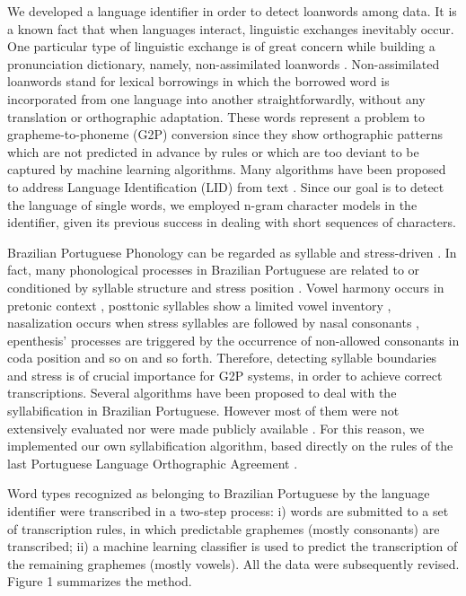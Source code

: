 We developed a language identifier in order to detect loanwords among data. It is a known fact that when languages interact, linguistic exchanges inevitably occur. One particular type of linguistic exchange is of great concern while building a pronunciation dictionary, namely, non-assimilated loanwords \cite{Bussmann96}. Non-assimilated loanwords stand for lexical borrowings in which the borrowed word is incorporated from one language into another straightforwardly, without any translation or orthographic adaptation. These words represent a problem to grapheme-to-phoneme (G2P) conversion since they show orthographic patterns which are not predicted in advance by rules or which are too deviant to be captured by machine learning algorithms. Many algorithms have been proposed to address Language Identification (LID) from text \cite{Bergsma2012, Bilcu2006, Dolf2012, Zampieri2012}. Since our goal is to detect the language of single words, we employed n-gram character  models in the identifier, given its previous success in dealing with short sequences of characters. 

Brazilian Portuguese Phonology can be regarded as syllable and stress-driven \cite{Cristofaro2005}. In fact, many phonological processes in Brazilian Portuguese are related to or conditioned by syllable structure and stress position \cite{Girelli1990}. Vowel harmony occurs in pretonic context \cite{Bisol1989}, posttonic syllables show a limited vowel inventory \cite{Cristofaro2005}, nasalization occurs when stress syllables are followed by nasal consonants \cite{Quicoli1990}, epenthesis' processes are triggered by the occurrence of non-allowed consonants in coda position \cite{Delatorre2005} and so on and so forth. Therefore, detecting syllable boundaries and stress is of crucial importance for G2P systems, in order to achieve correct transcriptions. Several algorithms have been proposed to deal with the syllabification in Brazilian Portuguese. However most of them were not extensively evaluated nor were made publicly available \cite{Oliveira2005, Nhenhem2012, Neto2011, Rocha2013}. For this reason, we implemented our own syllabification algorithm, 
based directly on the rules of the last Portuguese Language Orthographic Agreement \cite{Acordo2009}. 

Word types recognized as belonging to Brazilian Portuguese by the language identifier were transcribed in a two-step process: i) words are submitted to a set of transcription rules, in which predictable graphemes (mostly consonants) are transcribed; ii) a machine learning classifier is used to predict the transcription of the remaining graphemes (mostly vowels). All the data were subsequently revised. Figure 1 summarizes the method.

